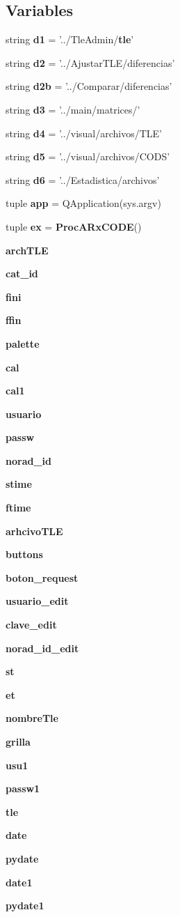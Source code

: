\subsection*{\-Variables}
\begin{DoxyCompactItemize}
\item 
string {\bf d1} = '../\-Tle\-Admin/{\bf tle}'
\item 
string {\bf d2} = '../\-Ajustar\-T\-L\-E/diferencias'
\item 
string {\bf d2b} = '../\-Comparar/diferencias'
\item 
string {\bf d3} = '../main/matrices/'
\item 
string {\bf d4} = '../visual/archivos/\-T\-L\-E'
\item 
string {\bf d5} = '../visual/archivos/\-C\-O\-D\-S'
\item 
string {\bf d6} = '../\-Estadistica/archivos'
\item 
tuple {\bf app} = \-Q\-Application(sys.\-argv)
\item 
tuple {\bf ex} = {\bf \-Proc\-A\-Rx\-C\-O\-D\-E}()
\item 
{\bf arch\-T\-L\-E}
\item 
{\bf cat\-\_\-id}
\item 
{\bf fini}
\item 
{\bf ffin}
\item 
{\bf palette}
\item 
{\bf cal}
\item 
{\bf cal1}
\item 
{\bf usuario}
\item 
{\bf passw}
\item 
{\bf norad\-\_\-id}
\item 
{\bf stime}
\item 
{\bf ftime}
\item 
{\bf arhcivo\-T\-L\-E}
\item 
{\bf buttons}
\item 
{\bf boton\-\_\-request}
\item 
{\bf usuario\-\_\-edit}
\item 
{\bf clave\-\_\-edit}
\item 
{\bf norad\-\_\-id\-\_\-edit}
\item 
{\bf st}
\item 
{\bf et}
\item 
{\bf nombre\-Tle}
\item 
{\bf grilla}
\item 
{\bf usu1}
\item 
{\bf passw1}
\item 
{\bf tle}
\item 
{\bf date}
\item 
{\bf pydate}
\item 
{\bf date1}
\item 
{\bf pydate1}
\end{DoxyCompactItemize}


